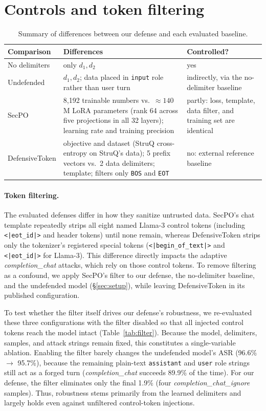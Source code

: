 \documentclass{article}
\begin{document}
\section{Controls and token filtering}
\label{app:filter}

\begin{table}[h]
  \caption{Summary of differences between our defense and each evaluated baseline.}
  \label{tab:controls}
  \centering
  \small
  \begin{tabular}{p{2.6cm}p{6.6cm}p{3.2cm}}
    \toprule
    Comparison & Differences & Controlled? \\
    \midrule
    No delimiters & only $d_1, d_2$ & yes \\
    Undefended & $d_1, d_2$; data placed in \texttt{input} role rather than user turn & indirectly, via the no-delimiter baseline \\
    SecPO & 8{,}192 trainable numbers vs.\ $\approx 140$M LoRA parameters (rank 64 across five projections in all 32 layers); learning rate and training precision & partly: loss, template, data filter, and training set are identical \\
    DefensiveToken & objective and dataset (StruQ cross-entropy on StruQ's data); 5 prefix vectors vs.\ 2 data delimiters; template; filters only \texttt{BOS} and \texttt{EOT} & no: external reference baseline \\
    \bottomrule
  \end{tabular}
\end{table}

\paragraph{Token filtering.} The evaluated defenses differ in how they sanitize untrusted data. SecPO's chat template repeatedly strips all eight named Llama-3 control tokens (including \texttt{<|eot\_id|>} and header tokens) until none remain, whereas DefensiveToken strips only the tokenizer's registered special tokens (\texttt{<|begin\_of\_text|>} and \texttt{<|eot\_id|>} for Llama-3). This difference directly impacts the adaptive \emph{completion\_chat} attacks, which rely on those control tokens. To remove filtering as a confound, we apply SecPO's filter to our defense, the no-delimiter baseline, and the undefended model (\S\ref{sec:setup}), while leaving DefensiveToken in its published configuration.

To test whether the filter itself drives our defense's robustness, we re-evaluated these three configurations with the filter disabled so that all injected control tokens reach the model intact (Table~\ref{tab:filter}). Because the model, delimiters, samples, and attack strings remain fixed, this constitutes a single-variable ablation. Enabling the filter barely changes the undefended model's ASR (96.6\% $\to$ 95.7\%), because the remaining plain-text \texttt{assistant} and \texttt{user} role strings still act as a forged turn (\emph{completion\_chat} succeeds 89.9\% of the time). For our defense, the filter eliminates only the final 1.9\% (four \emph{completion\_chat\_ignore} samples). Thus, robustness stems primarily from the learned delimiters and largely holds even against unfiltered control-token injections.
\end{document}
